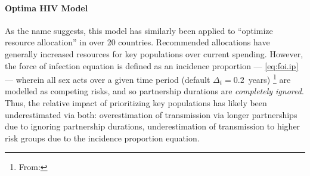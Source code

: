 \paragraph{Optima HIV Model}\cite{Kerr2015,Stuart2018,Kerr2020,Optima2021}
As the name suggests, this model has similarly been applied to
``optimize resource allocation'' in over 20 countries.
Recommended allocations have generally increased resources for key populations over current spending.
However, the force of infection equation is defined as
an incidence proportion \cite{Kerr2020} --- \eqref{eq:foi.ip} ---
wherein all sex acts over a given time period (default $\Delta_t = 0.2$~years)%
\footnote{From: }
are modelled as competing risks, and so partnership durations are \emph{completely ignored}.
Thus, the relative impact of prioritizing key populations
has likely been underestimated via both:
overestimation of transmission via longer partnerships due to ignoring partnership durations,
underestimation of transmission to higher risk groups due to the incidence proportion equation.
